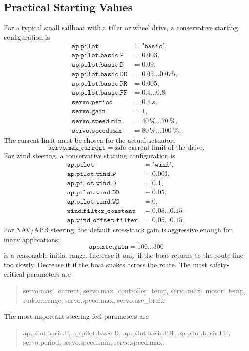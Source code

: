 \documentclass[10pt,twocolumn]{article}
\begin{document}
\subsection{Practical Starting Values}
For a typical small sailboat with a tiller or wheel drive, a conservative
starting configuration is
\[
\begin{array}{ll}
\texttt{ap.pilot} &= \texttt{"basic"},\\
\texttt{ap.pilot.basic.P} &= \num{0.003},\\
\texttt{ap.pilot.basic.D} &= \num{0.09},\\
\texttt{ap.pilot.basic.DD} &= \num{0.05}\ldots\num{0.075},\\
\texttt{ap.pilot.basic.PR} &= \num{0.005},\\
\texttt{ap.pilot.basic.FF} &= \num{0.4}\ldots\num{0.8},\\
\texttt{servo.period} &= \SI{0.4}{s},\\
\texttt{servo.gain} &= \num{1},\\
\texttt{servo.speed.min} &= \SI{40}{\percent}\ldots\SI{70}{\percent},\\
\texttt{servo.speed.max} &= \SI{80}{\percent}\ldots\SI{100}{\percent}.
\end{array}
\]
The current limit must be chosen for the actual actuator:
\[
\texttt{servo.max\_current}
=
\text{safe current limit of the drive}.
\]
For wind steering, a conservative starting configuration is
\[
\begin{array}{ll}
\texttt{ap.pilot} &= \texttt{"wind"},\\
\texttt{ap.pilot.wind.P} &= \num{0.003},\\
\texttt{ap.pilot.wind.D} &= \num{0.1},\\
\texttt{ap.pilot.wind.DD} &= \num{0.05},\\
\texttt{ap.pilot.wind.WG} &= \num{0},\\
\texttt{wind.filter\_constant} &= \num{0.05}\ldots\num{0.15},\\
\texttt{ap.wind\_offset\_filter} &= \num{0.05}\ldots\num{0.15}.
\end{array}
\]
For NAV/APB steering, the default cross-track gain is aggressive enough
for many applications:
\[
\texttt{apb.xte.gain}
=
\num{100}\ldots\num{300}
\]
is a reasonable initial range.  Increase it only if the boat returns to
the route line too slowly.  Decrease it if the boat snakes across the
route.
The most safety-critical parameters are
\begin{quote}
\scriptsize\ttfamily
servo.max\_current, servo.max\_controller\_temp, servo.max\_motor\_temp,
rudder.range, servo.speed.max, servo.use\_brake.
\end{quote}
The most important steering-feel parameters are
\begin{quote}
\scriptsize\ttfamily
ap.pilot.basic.P, ap.pilot.basic.D, ap.pilot.basic.PR, ap.pilot.basic.FF,
servo.period, servo.speed.min, servo.speed.max.
\end{quote}
\end{document}
